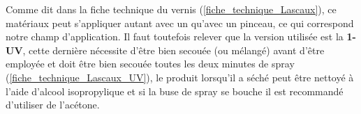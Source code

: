 Comme dit dans la fiche technique du vernis (\ref{fiche_technique_Lascaux}), ce matériaux peut s'appliquer autant avec un  qu'avec
un pinceau, ce qui correspond notre champ d'application. Il faut toutefois relever que la version utilisée est la \textbf{1-UV}, cette dernière nécessite d'être
bien secouée (ou mélangé) avant d'être employée et doit être bien secouée toutes les deux minutes de spray (\ref{fiche_technique_Lascaux_UV}), le produit lorsqu'il a séché
peut être nettoyé à l'aide d'alcool isopropylique et si la buse de spray se bouche il est recommandé d'utiliser de l'acétone.

\begin{table}[H]
    \centering
    \caption{Table des avantages et inconvénients du vernis Lascaux}
    \label{tab:lascaux_UV}
\end{table}

\newpage
